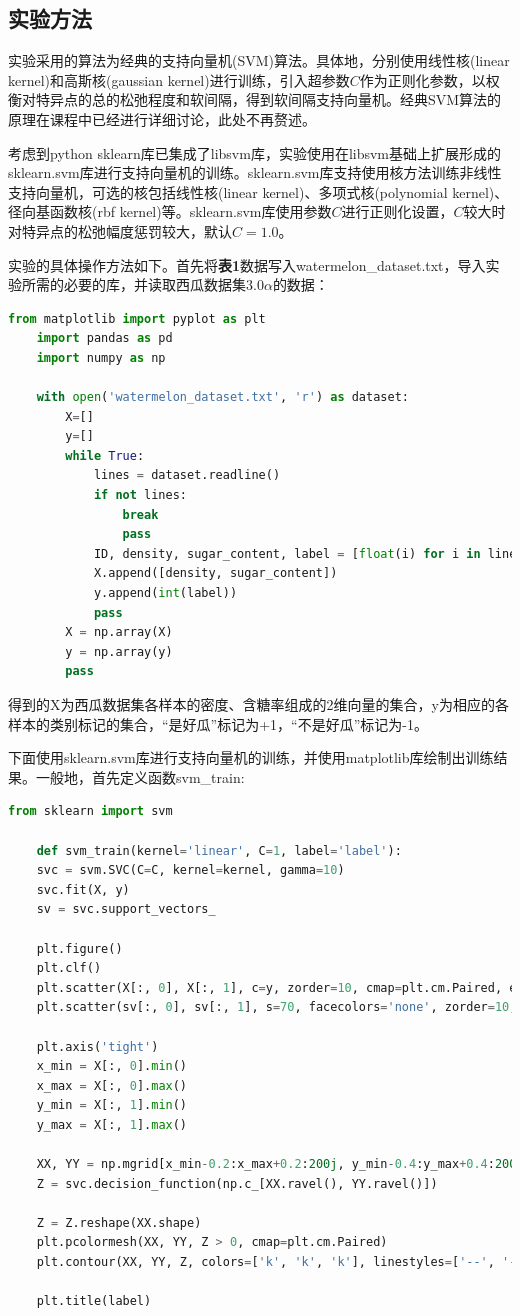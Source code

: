 \documentclass[12pt]{article}
\begin{document}
\subsection{实验方法}
实验采用的算法为经典的支持向量机(SVM)算法。具体地，分别使用线性核(linear kernel)和高斯核(gaussian kernel)进行训练，引入超参数$C$作为正则化参数，以权衡对特异点的总的松弛程度和软间隔，得到软间隔支持向量机。经典SVM算法的原理在课程中已经进行详细讨论，此处不再赘述。\par
考虑到python sklearn库已集成了libsvm库，实验使用在libsvm基础上扩展形成的sklearn.svm库进行支持向量机的训练。sklearn.svm库支持使用核方法训练非线性支持向量机，可选的核包括线性核(linear kernel)、多项式核(polynomial kernel)、径向基函数核(rbf kernel)等。sklearn.svm库使用参数$C$进行正则化设置，$C$较大时对特异点的松弛幅度惩罚较大，默认$C=1.0$。\par 
实验的具体操作方法如下。首先将\textbf{表1}数据写入watermelon\_dataset.txt，导入实验所需的必要的库，并读取西瓜数据集$3.0\alpha$的数据：
\begin{lstlisting}[language=python]
	from matplotlib import pyplot as plt
	import pandas as pd
	import numpy as np

	with open('watermelon_dataset.txt', 'r') as dataset:
		X=[]
		y=[]
		while True:
			lines = dataset.readline()
			if not lines:
				break
				pass
			ID, density, sugar_content, label = [float(i) for i in lines.split()]
			X.append([density, sugar_content])
			y.append(int(label))
			pass
		X = np.array(X)
		y = np.array(y)
		pass
\end{lstlisting}
得到的X为西瓜数据集各样本的密度、含糖率组成的2维向量的集合，y为相应的各样本的类别标记的集合，“是好瓜”标记为+1，“不是好瓜”标记为-1。\par 
下面使用sklearn.svm库进行支持向量机的训练，并使用matplotlib库绘制出训练结果。一般地，首先定义函数svm\_train:
\\
\begin{lstlisting}[language=python]
	from sklearn import svm
	
	def svm_train(kernel='linear', C=1, label='label'):
	svc = svm.SVC(C=C, kernel=kernel, gamma=10)
	svc.fit(X, y)
	sv = svc.support_vectors_
	
	plt.figure()
	plt.clf()
	plt.scatter(X[:, 0], X[:, 1], c=y, zorder=10, cmap=plt.cm.Paired, edgecolor='k', s=30)
	plt.scatter(sv[:, 0], sv[:, 1], s=70, facecolors='none', zorder=10, edgecolor='k')
	
	plt.axis('tight')
	x_min = X[:, 0].min()
	x_max = X[:, 0].max()
	y_min = X[:, 1].min()
	y_max = X[:, 1].max()
	
	XX, YY = np.mgrid[x_min-0.2:x_max+0.2:200j, y_min-0.4:y_max+0.4:200j]
	Z = svc.decision_function(np.c_[XX.ravel(), YY.ravel()])
	
	Z = Z.reshape(XX.shape)
	plt.pcolormesh(XX, YY, Z > 0, cmap=plt.cm.Paired)
	plt.contour(XX, YY, Z, colors=['k', 'k', 'k'], linestyles=['--', '-', '--'], levels=[-.5, 0, .5])
	
	plt.title(label)
\end{lstlisting}
\end{document}
